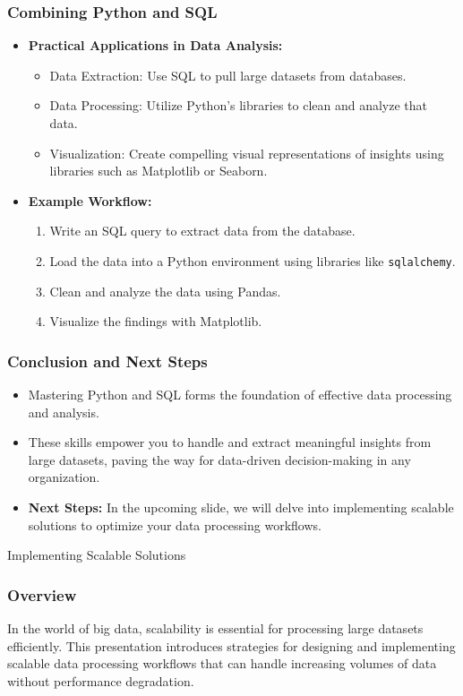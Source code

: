 \documentclass[aspectratio=169]{beamer}
\begin{document}
\begin{frame}[fragile]
    \frametitle{Combining Python and SQL}
    \begin{itemize}
        \item \textbf{Practical Applications in Data Analysis:}
        \begin{itemize}
            \item Data Extraction: Use SQL to pull large datasets from databases.
            \item Data Processing: Utilize Python’s libraries to clean and analyze that data.
            \item Visualization: Create compelling visual representations of insights using libraries such as Matplotlib or Seaborn.
        \end{itemize}
        \item \textbf{Example Workflow:}
        \begin{enumerate}
            \item Write an SQL query to extract data from the database.
            \item Load the data into a Python environment using libraries like \texttt{sqlalchemy}.
            \item Clean and analyze the data using Pandas.
            \item Visualize the findings with Matplotlib.
        \end{enumerate}
    \end{itemize}
\end{frame}

\begin{frame}[fragile]
    \frametitle{Conclusion and Next Steps}
    \begin{itemize}
        \item Mastering Python and SQL forms the foundation of effective data processing and analysis.
        \item These skills empower you to handle and extract meaningful insights from large datasets, paving the way for data-driven decision-making in any organization.
        \item \textbf{Next Steps:} In the upcoming slide, we will delve into implementing scalable solutions to optimize your data processing workflows.
    \end{itemize}
\end{frame}

\begin{frame}{Implementing Scalable Solutions}
    \frametitle{Overview}
    In the world of big data, scalability is essential for processing large datasets efficiently. This presentation introduces strategies for designing and implementing scalable data processing workflows that can handle increasing volumes of data without performance degradation.
\end{frame}
\end{document}

